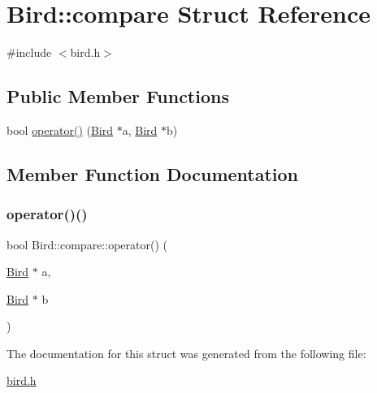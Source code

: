 \hypertarget{structBird_1_1compare}{}\section{Bird\+:\+:compare Struct Reference}
\label{structBird_1_1compare}


{\ttfamily \#include $<$bird.\+h$>$}

\subsection*{Public Member Functions}
\begin{DoxyCompactItemize}
\item 
bool \hyperlink{structBird_1_1compare_a4c828e376650a2c8767edd0e09f93bbe}{operator()} (\hyperlink{classBird}{Bird} $\ast$a, \hyperlink{classBird}{Bird} $\ast$b)
\end{DoxyCompactItemize}


\subsection{Member Function Documentation}
\mbox{\label{structBird_1_1compare_a4c828e376650a2c8767edd0e09f93bbe}} 
\subsubsection{\texorpdfstring{operator()()}{operator()()}}
{\footnotesize\ttfamily bool Bird\+::compare\+::operator() (\begin{DoxyParamCaption}\item[{\hyperlink{classBird}{Bird} $\ast$}]{a,  }\item[{\hyperlink{classBird}{Bird} $\ast$}]{b }\end{DoxyParamCaption})\hspace{0.3cm}{\ttfamily [inline]}}



The documentation for this struct was generated from the following file\+:\begin{DoxyCompactItemize}
\item 
\hyperlink{bird_8h}{bird.\+h}\end{DoxyCompactItemize}
